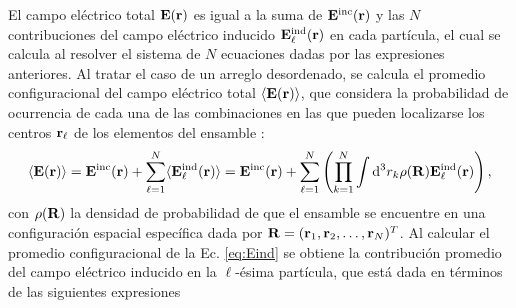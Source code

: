 El campo eléctrico total $\vb{E}(\vb{r})$ es igual a la suma de $\vb{E}^\text{inc}(\vb{r})$ y las $N$ contribuciones del campo eléctrico inducido $\vb{E}^\text{ind}_\ell(\vb{r})$ en cada partícula, el cual se calcula al resolver el sistema de $N$ ecuaciones dadas por las expresiones anteriores. Al tratar el caso de un arreglo desordenado, se calcula el promedio configuracional del campo eléctrico total  $\langle\vb{E}(\vb{r})\rangle$, que considera la probabilidad de ocurrencia de cada una de las combinaciones en las que pueden localizarse los centros $\vb{r}_\ell$ de los elementos del ensamble \cite{garcia2012multiple,barrera_coherent_2003}:
%
\begin{align}
	\langle\vb{E}(\vb{r})\rangle =
	\vb{E}^\text{inc}(\vb{r}) + \sum_{\ell = 1}^N \langle  \vb{E}^\text{ind}_\ell  (\vb{r})\rangle
	= \vb{E}^\text{inc}(\vb{r}) +  \sum_{\ell = 1}^N  \left(\prod_{k = 1}^N \int\dd^3 r_k \rho(\vb{R}) \vb{E}^\text{ind}_\ell(\vb{r})\right),
	\label{eq:Eave}
\end{align}
%
con $\rho(\vb{R})$ la densidad de probabilidad de que el ensamble se encuentre en una configuración espacial específica dada por $\vb{R} = (\vb{r}_1,\vb{r}_2,\ldots,\vb{r}_N)^T$. Al calcular el promedio configuracional de la Ec. \eqref{eq:Eind} se obtiene la contribución promedio del campo eléctrico inducido en la $\ell$-ésima partícula, que está dada en términos de las siguientes expresiones \cite{barrera_coherent_2003,garcia2012multiple}

